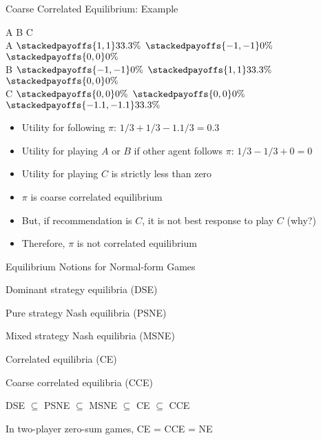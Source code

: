 \documentclass[11pt,aspectratio=169,handout]{beamer}
\begin{document}
  
  \begin{frame}{Coarse Correlated Equilibrium: Example}
   \begin{center}\scriptsize
   \renewcommand{\gamestretch}{2.5}
    \hspace{-3.2em}
    \begin{game}{3}{3}
         \> A								\> B     							\> C											\\
     A   \> $\stackedpayoffs{1, 1}{33.3\%}$	\> $\stackedpayoffs{-1, -1}{0\%}$		\> $\stackedpayoffs{0, 0}{0\%}$				\\
     B   \> $\stackedpayoffs{-1,  -1}{0\%}$	\> $\stackedpayoffs{1,  1}{33.3\%}$	\> $\stackedpayoffs{0, 0}{0\%}$				\\
     C   \> $\stackedpayoffs{0,  0}{0\%}$		\> $\stackedpayoffs{0,  0}{0\%}$		\> $\stackedpayoffs{-1.1, -1.1}{33.3\%}$	\\
    \end{game}
   \end{center}
   \vspace{1em}
   \begin{itemize}[<+->] \footnotesize
    \item Utility for following $\pi$: $1/3 + 1/3 - 1.1/3 = 0.3$
    \item Utility for playing $A$ or $B$ if other agent follows $\pi$: $1/3 - 1/3 + 0 = 0$
    \item Utility for playing $C$ is strictly less than zero
    \item $\pi$ \alert{is coarse correlated} equilibrium 
    \item But, if recommendation is $C$, it is not best response to play $C$ (why?)
    \item Therefore, $\pi$ \alert{is not correlated equilibrium}
   \end{itemize}
  \end{frame}
  
  
  \begin{frame}{Equilibrium Notions for Normal-form Games}
   \begin{itemizes}
    \item Dominant strategy equilibria (DSE)
    \item Pure strategy Nash equilibria (PSNE)
    \item Mixed strategy Nash equilibria (MSNE)
    \item Correlated equilibria (CE)
    \item Coarse correlated equilibria (CCE)
    \item<2-> DSE $\subseteq$ PSNE $\subseteq$ MSNE $\subseteq$ CE $\subseteq$ CCE
    \item<3-> In two-player zero-sum games, CE = CCE = NE 
   \end{itemizes}
  \end{frame}
  
\end{document}

